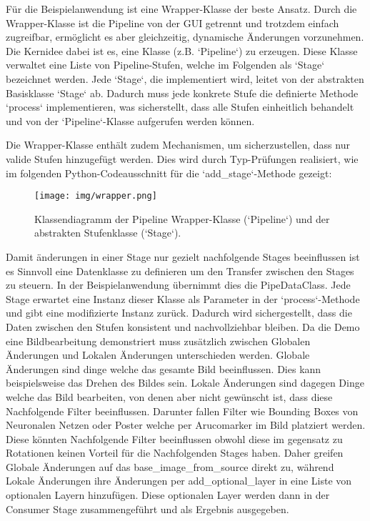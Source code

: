 \documentclass[a4paper]{article} %
\begin{document}
Für die Beispielanwendung ist eine Wrapper-Klasse der beste Ansatz. Durch die Wrapper-Klasse ist die Pipeline von der GUI getrennt und trotzdem einfach zugreifbar, ermöglicht es aber gleichzeitig, dynamische Änderungen vorzunehmen. Die Kernidee dabei ist es, eine Klasse (z.B. `Pipeline`) zu erzeugen. Diese Klasse verwaltet eine Liste von Pipeline-Stufen, welche im Folgenden als `Stage` bezeichnet werden. Jede `Stage`, die implementiert wird, leitet von der abstrakten Basisklasse `Stage` ab. Dadurch muss jede konkrete Stufe die definierte Methode `process` implementieren, was sicherstellt, dass alle Stufen einheitlich behandelt und von der `Pipeline`-Klasse aufgerufen werden können. 

Die Wrapper-Klasse enthält zudem Mechanismen, um sicherzustellen, dass nur valide Stufen hinzugefügt werden. Dies wird durch Typ-Prüfungen realisiert, wie im folgenden Python-Codeausschnitt für die `add_stage`-Methode gezeigt:

\begin{figure}[htbp]
    \centering
    \texttt{[image: img/wrapper.png]}
    \caption{Klassendiagramm der Pipeline Wrapper-Klasse (`Pipeline`) und der abstrakten Stufenklasse (`Stage`).}
    \label{fig:wrapper}
\end{figure}

Damit änderungen in einer Stage nur gezielt nachfolgende Stages beeinflussen ist es Sinnvoll eine Datenklasse zu definieren um den Transfer zwischen den Stages zu steuern. In der Beispielanwendung übernimmt dies die PipeDataClass. Jede Stage erwartet eine Instanz dieser Klasse als Parameter in der `process`-Methode und gibt eine modifizierte Instanz zurück. Dadurch wird sichergestellt, dass die Daten zwischen den Stufen konsistent und nachvollziehbar bleiben.
Da die Demo eine Bildbearbeitung demonstriert muss zusätzlich zwischen Globalen Änderungen und Lokalen Änderungen unterschieden werden. Globale Änderungen sind dinge welche das gesamte Bild beeinflussen. Dies kann beispielsweise das Drehen des Bildes sein. Lokale Änderungen sind dagegen Dinge welche das Bild bearbeiten, von denen aber nicht gewünscht ist, dass diese Nachfolgende Filter beeinflussen. Darunter fallen Filter wie Bounding Boxes von Neuronalen Netzen oder Poster welche per Arucomarker im Bild platziert werden. Diese könnten Nachfolgende Filter beeinflussen obwohl diese im gegensatz zu Rotationen keinen Vorteil für die Nachfolgenden Stages haben. Daher greifen Globale Änderungen auf das base_image_from_source direkt zu, während Lokale Änderungen ihre Änderungen per add_optional_layer in eine Liste von optionalen Layern hinzufügen. Diese optionalen Layer werden dann in der Consumer Stage zusammengeführt und als Ergebnis ausgegeben.
\end{document}
